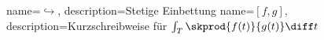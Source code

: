 
 {
    name={\ensuremath{\hookrightarrow}},
    description={Stetige Einbettung}
}
 {
    name={\ensuremath{[f, g]}},
    description={Kurzschreibweise für \ensuremath{\int_{T} \skprod{f(t)}{g(t)} \diff t}}
}
